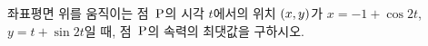 좌표평면 위를 움직이는 점~$\mathrm{P}$의 시각 $t$에서의 위치 $(x{,}\mkern3mu\mathopen{}y)$가 $x=-1+\cos 2t$, $y=t+\sin 2t$일 때, 점~$\mathrm{P}$의 속력의 최댓값을 구하시오.
